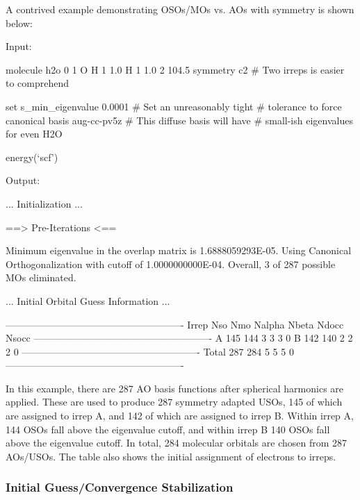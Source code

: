 A contrived example demonstrating OSOs/MOs vs. AOs with symmetry is shown below:
\begin{Snippet}
Input:

molecule h2o {
0 1
O
H 1 1.0
H 1 1.0 2 104.5
symmetry c2 # Two irreps is easier to comprehend
}

set {
s_min_eigenvalue 0.0001 # Set an unreasonably tight 
                        # tolerance to force canonical
basis aug-cc-pv5z       # This diffuse basis will have 
                        # small-ish eigenvalues for even H2O
}

energy(`scf')

Output:

  ... Initialization ...

  ==> Pre-Iterations <==

  Minimum eigenvalue in the overlap matrix is 1.6888059293E-05.
  Using Canonical Orthogonalization with cutoff of 1.0000000000E-04.
  Overall, 3 of 287 possible MOs eliminated. 

  ... Initial Orbital Guess Information ...

   -------------------------------------------------------
    Irrep   Nso     Nmo     Nalpha   Nbeta   Ndocc  Nsocc
   -------------------------------------------------------
     A        145     144       3       3       3       0
     B        142     140       2       2       2       0
   -------------------------------------------------------
    Total     287     284       5       5       5       0
   -------------------------------------------------------

\end{Snippet}   
In this example, there are 287 AO basis functions after spherical harmonics are
applied. These are used to produce 287 symmetry adapted USOs, 145 of which are
assigned to irrep A, and 142 of which are assigned to irrep B. Within irrep A,
144 OSOs fall above the eigenvalue cutoff, and within irrep B 140 OSOs fall
above the eigenvalue cutoff. In total, 284 molecular orbitals are chosen from
287 AOs/USOs. The table also shows the initial assignment of electrons to
irreps.  

\subsubsection{Initial Guess/Convergence Stabilization}


